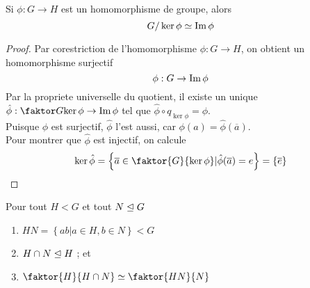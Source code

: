\documentclass[../main.tex]{subfiles}
\begin{document}
\begin{thm}
	Si $\phi: G \to H$ est un homomorphisme de groupe, alors
	\[ 
	G / \ker\phi \simeq \operatorname{Im}\phi
	\]
		
\end{thm}
\begin{proof}
	Par corestriction de l'homomorphisme $\phi: G\to H$, on obtient un homomorphisme surjectif
	\[ 
	\phi: G \to \operatorname{Im}\phi
	\]
	Par la propriete universelle du quotient, il existe un unique $\hat{\phi}: \faktor G { \ker\phi} \to \im\phi $ 	tel que $ \hat{\phi}\circ q_{\ker\phi} = \phi$.\\
	Puisque $\phi$ est surjectif, $ \hat{\phi}$ l'est aussi, car $\phi( a) = \hat{\phi}( \overline{a}) $.\\
	Pour montrer que $ \hat{\phi}$ est injectif, on calcule
	\[ 
		\ker \hat{\phi} = \left\{ \overline{a} \in \faktor { G} {\ker\phi} | \hat{\phi}( \overline{a}) =e  \right\} = \left\{ \overline{e} \right\} 	 
	\]
	
\end{proof}
\begin{thm}
	Pour tout $H< G$ et tout $N \trianglelefteq G$ 
	\begin{enumerate}
	\item $ HN = \left\{ ab| a \in H, b \in N \right\} < G$ 
	\item $H \cap N \trianglelefteq H$ ; et
	\item $  \faktor {H} {H\cap N} \simeq \faktor {HN} {N} $ 
	\end{enumerate}
	
\end{thm}
\end{document}

